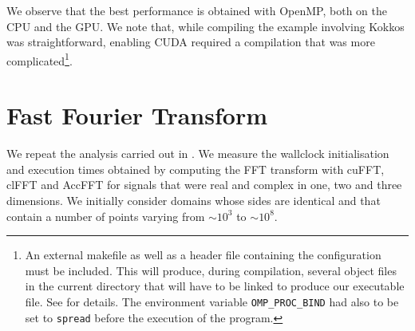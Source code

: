 \documentclass[12pt, a4paper]{article}
\begin{document}
We observe that the best performance is obtained with OpenMP, both on
the CPU and the GPU. We note that, while compiling the example
involving Kokkos was straightforward, enabling CUDA required a
compilation that was more complicated\footnote{An external makefile as
  well as a header file containing the configuration must be
  included. This will produce, during compilation, several object
  files in the current directory that will have to be linked to
  produce our executable file. See \cite{KOKKOSDOC} for details. The
  environment variable \texttt{OMP\_PROC\_BIND} had also to be set to
  \texttt{spread} before the execution of the program.}.

\section{Fast Fourier Transform}\label{FFT}
We repeat the analysis carried out in \cite{FFTREPORT}. We measure the
wallclock initialisation and execution times obtained by computing the
FFT transform with cuFFT, clFFT and AccFFT for signals that were real
and complex in one, two and three dimensions. We initially consider
domains whose sides are identical and that contain a number of points
varying from $\sim 10^3$ to $\sim 10^8$.
\end{document}
